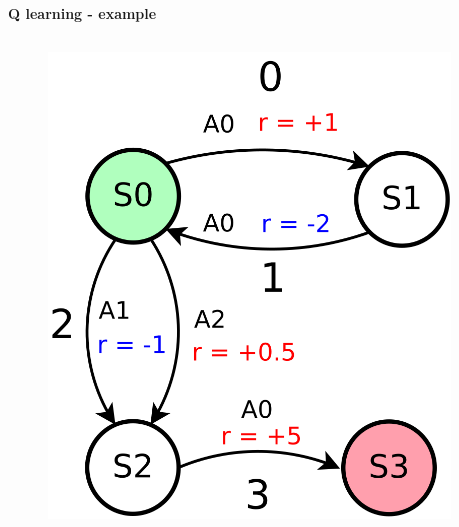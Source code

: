 \documentclass[xcolor=dvipsnames]{beamer}
\begin{document}
\begin{frame}{\bf Q learning - example}


\begin{columns}
    \begin{column}{0.5\textwidth}

        \begin{figure}
          \includegraphics[scale=0.15]{../../diagrams/q_learning_example_02.png}
        \end{figure}

    \end{column}
    \begin{column}{0.5\textwidth}

    {\footnotesize


}
\end{column}
\end{columns}
\end{frame}
\end{document}
